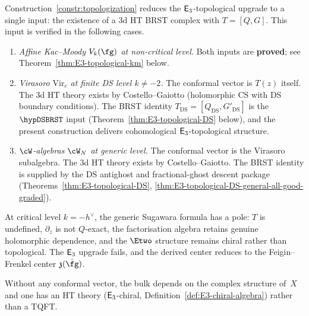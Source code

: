 \begin{remark}
\label{rem:topologization-scope-3d}
Construction~\ref{constr:topologization} reduces the
$\mathsf{E}_3$-topological upgrade to a single input: the
existence of a $3$d HT BRST complex with $T = [Q, G]$.
This input is verified in the following cases.
\begin{enumerate}[label=\textup{(\roman*)}]
\item \emph{Affine Kac--Moody $V_k(\fg)$ at non-critical level.}
 Both inputs are \textbf{proved}; see
 Theorem~\ref{thm:E3-topological-km} below.
\item \emph{Virasoro $\mathrm{Vir}_c$ at finite DS level
$k\ne -2$.}
The conformal vector is $T(z)$ itself.
The $3$d HT theory exists by Costello--Gaiotto
 (holomorphic CS with DS boundary conditions).
 The BRST identity
 $T_{\mathrm{DS}} = [Q_{\mathrm{DS}}, G'_{\mathrm{DS}}]$ is the
 \(\hypDSBRST\) input
 \textup{(}Theorem~\textup{\ref{thm:E3-topological-DS}}
 below\textup{)}, and the present construction delivers
 cohomological $\mathsf{E}_3$-topological structure.
\item \emph{$\cW$-algebras $\cW_N$ at generic level.}
 The conformal vector is the Virasoro subalgebra.
 The $3$d HT theory exists by Costello--Gaiotto.
 The BRST identity is supplied by the DS antighost and
 fractional-ghost descent package
 \textup{(}Theorems~\textup{\ref{thm:E3-topological-DS}},
 \ref{thm:E3-topological-DS-general-all-good-graded}\textup{)}.
\end{enumerate}
At critical level $k = -h^\vee$, the generic Sugawara formula has a
pole: $T$ is undefined, $\partial_z$ is not $Q$-exact, the
factorisation algebra retains genuine holomorphic dependence,
and the $\Etwo$ structure remains chiral rather than
topological. The $\mathsf{E}_3$ upgrade fails, and the derived
center reduces to the Feigin--Frenkel center
$\mathfrak{z}(\hat{\fg})$.

Without any conformal vector, the bulk depends on the complex
structure of~$X$ and one has an HT theory
\textup{(}$\mathsf{E}_3$-chiral,
Definition~\textup{\ref{def:E3-chiral-algebra}}\textup{)}
rather than a TQFT.
\end{remark}

